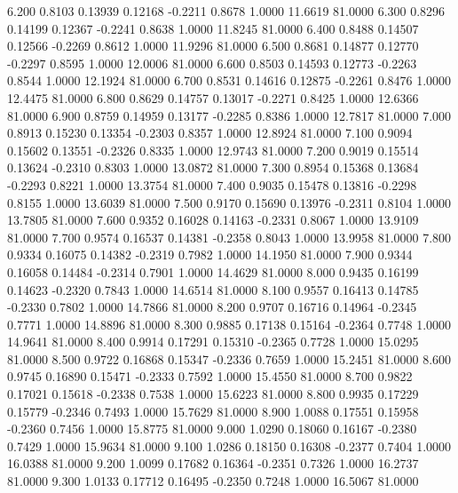    6.200   0.8103   0.13939   0.12168  -0.2211   0.8678   1.0000  11.6619  81.0000
   6.300   0.8296   0.14199   0.12367  -0.2241   0.8638   1.0000  11.8245  81.0000
   6.400   0.8488   0.14507   0.12566  -0.2269   0.8612   1.0000  11.9296  81.0000
   6.500   0.8681   0.14877   0.12770  -0.2297   0.8595   1.0000  12.0006  81.0000
   6.600   0.8503   0.14593   0.12773  -0.2263   0.8544   1.0000  12.1924  81.0000
   6.700   0.8531   0.14616   0.12875  -0.2261   0.8476   1.0000  12.4475  81.0000
   6.800   0.8629   0.14757   0.13017  -0.2271   0.8425   1.0000  12.6366  81.0000
   6.900   0.8759   0.14959   0.13177  -0.2285   0.8386   1.0000  12.7817  81.0000
   7.000   0.8913   0.15230   0.13354  -0.2303   0.8357   1.0000  12.8924  81.0000
   7.100   0.9094   0.15602   0.13551  -0.2326   0.8335   1.0000  12.9743  81.0000
   7.200   0.9019   0.15514   0.13624  -0.2310   0.8303   1.0000  13.0872  81.0000
   7.300   0.8954   0.15368   0.13684  -0.2293   0.8221   1.0000  13.3754  81.0000
   7.400   0.9035   0.15478   0.13816  -0.2298   0.8155   1.0000  13.6039  81.0000
   7.500   0.9170   0.15690   0.13976  -0.2311   0.8104   1.0000  13.7805  81.0000
   7.600   0.9352   0.16028   0.14163  -0.2331   0.8067   1.0000  13.9109  81.0000
   7.700   0.9574   0.16537   0.14381  -0.2358   0.8043   1.0000  13.9958  81.0000
   7.800   0.9334   0.16075   0.14382  -0.2319   0.7982   1.0000  14.1950  81.0000
   7.900   0.9344   0.16058   0.14484  -0.2314   0.7901   1.0000  14.4629  81.0000
   8.000   0.9435   0.16199   0.14623  -0.2320   0.7843   1.0000  14.6514  81.0000
   8.100   0.9557   0.16413   0.14785  -0.2330   0.7802   1.0000  14.7866  81.0000
   8.200   0.9707   0.16716   0.14964  -0.2345   0.7771   1.0000  14.8896  81.0000
   8.300   0.9885   0.17138   0.15164  -0.2364   0.7748   1.0000  14.9641  81.0000
   8.400   0.9914   0.17291   0.15310  -0.2365   0.7728   1.0000  15.0295  81.0000
   8.500   0.9722   0.16868   0.15347  -0.2336   0.7659   1.0000  15.2451  81.0000
   8.600   0.9745   0.16890   0.15471  -0.2333   0.7592   1.0000  15.4550  81.0000
   8.700   0.9822   0.17021   0.15618  -0.2338   0.7538   1.0000  15.6223  81.0000
   8.800   0.9935   0.17229   0.15779  -0.2346   0.7493   1.0000  15.7629  81.0000
   8.900   1.0088   0.17551   0.15958  -0.2360   0.7456   1.0000  15.8775  81.0000
   9.000   1.0290   0.18060   0.16167  -0.2380   0.7429   1.0000  15.9634  81.0000
   9.100   1.0286   0.18150   0.16308  -0.2377   0.7404   1.0000  16.0388  81.0000
   9.200   1.0099   0.17682   0.16364  -0.2351   0.7326   1.0000  16.2737  81.0000
   9.300   1.0133   0.17712   0.16495  -0.2350   0.7248   1.0000  16.5067  81.0000

